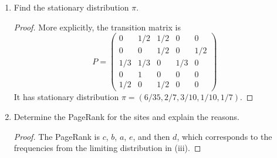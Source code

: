 \documentclass[oneside,reqno]{amsart}
\theoremstyle{definition}
\begin{document}
\begin{enumerate}
\begin{proof}
To demonstrate that this chain is irreducible, we show by inspection that for any initial state $i$ it is there is a nonzero probability of reaching any other state, i.e., the vertex set (state space) $V$ is a single communicating class. For the chain started at $a$, 
\begin{align*}
	p(a,b) &= 1/2>0 \\
	p(a,c) &= 1/2>0 \\
	p(a,d) &= p(a,b)p(b,c)p(c,d) = 1/2 \cdot 1/2 \cdot 1/3 \cdot >0 \\
	 p(a,e) &=p(a,b)p(b,e) = 1/2 \cdot 1/2>0. 
\end{align*}
For the chain started at $b$, 
\begin{align*}
	p(b,a) &= p(b,c)p(c,a) = 1/2 \cdot 1/3 >0 \\
	p(b,c) &= 1/2 > 0 \\
	p(b,d) &= p(b,c)p(c,d) = 1/2 \cdot 1/3 >0 \\
	p(b,e) &= 1/2 > 0.
\end{align*} 
For the chain started in $c$,
\begin{align*}
	p(c,a) &= 1/3>0 \\
	p(c,b) &= p(c,a)p(a,b) = 1/2 \cdot 1/2 > 0 \\
	p(c,d) &= 1/3>0 \\
	p(c,e) &= p(a,c)p(a,b)p(b,e) =1/3 \cdot 1/2 \cdot 1/2 >0. 
\end{align*}
For the chain started in $d$, 
\[
	p(d,a) =p(d,b) p(b,e) p(e,a) = 1 \cdot 1/2 \cdot 1/2 > 0,
\]
and as just shown, every state is accessible from $b$ and hence every state is accessible from $d$. For the chain started in $e$, 
\[
	p(e,a) = 1/2>0,
\] 
and again since every state is accessible from state $a$, every state is also accessible from $d$. Since every state leads to every other states, all states communicate with each other, and so the chain is irreducible.
\end{proof}

\item
Find the stationary distribution $\pi$. 

\begin{proof}
More explicitly, the transition matrix is
\[
	P=\begin{pmatrix}
		0 & 1/2 & 1/2 & 0 & 0 \\
		0 & 0 & 1/2 & 0 & 1/2 \\
		1/3 & 1/3 & 0 & 1/3  & 0 \\
		0 & 1 & 0 & 0 & 0  \\
		1/2 & 0 & 1/2 & 0 & 0	
	\end{pmatrix}
\]
It has stationary distribution $\pi = (6/35, 2/7, 3/10, 1/10, 1/7)$.
\end{proof}

\item
Determine the PageRank for the sites and explain the reasons.

\begin{proof}
The PageRank is $c$, $b$, $a$, $e$, and then $d$, which corresponds to the frequencies from the limiting distribution in (iii). 
\end{proof}

\end{enumerate}
\end{document}
